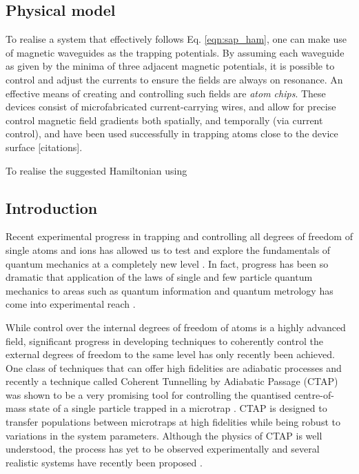 \subsection{Physical model}
To realise a system that effectively follows Eq. \ref{eqn:sap_ham}, one can make use of magnetic waveguides as the trapping potentials. By assuming each waveguide as given by the minima of three adjacent magnetic potentials, it is possible to control and adjust the currents to ensure the fields are always on resonance. An effective means of creating and controlling such fields are
\textit{atom chips}. These devices consist of microfabricated current-carrying wires, and allow for precise control magnetic field gradients both spatially, and temporally (via current control), and have been used successfully in trapping atoms close to the device surface [citations].

To realise the suggested Hamiltonian using















\iffalse




\subsection{Introduction}
\label{sec:Introduction}
Recent experimental progress in trapping and controlling all degrees of freedom of single atoms and ions has allowed us to test and
explore the fundamentals of quantum mechanics at a completely new level \cite{Chen:11,Bergmann:98}. In fact, progress has been so dramatic that application of the laws of single and few particle quantum mechanics to areas such as quantum information and quantum metrology has come into experimental reach \cite{Nielsen:00,Riedel:10}.

While control over the internal degrees of freedom of atoms is a highly advanced field, significant progress in developing techniques to coherently control the external degrees of freedom to the same level has only recently been achieved. One class of techniques that can offer high fidelities are adiabatic processes and recently a technique called Coherent Tunnelling by Adiabatic Passage (CTAP) was shown to be a very promising tool for controlling the quantised centre-of-mass state of a single particle trapped in a microtrap \cite{Eckert:04}. CTAP is designed to transfer populations between microtraps at high fidelities while being robust to variations in the system parameters. Although the physics of CTAP is well understood, the process has yet to be observed experimentally and several realistic systems have recently been proposed \cite{Eckert:06,Morgan:11,Kohler:13}.

